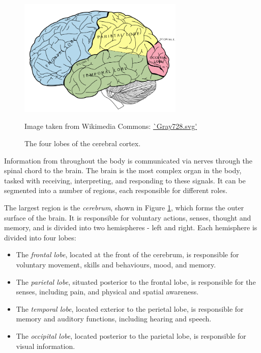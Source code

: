\begin{figure}[ht]
	\centering
	\includegraphics[width=0.7\textwidth]{Images/2_Lobes_of_the_brain_NL.png}
	\caption{The four lobes of the cerebral cortex.}
	\small Image taken from Wikimedia Commons: \url{`Gray728.svg'}
	\label{svd-cerebrumfig}
\end{figure}

Information from throughout the body is communicated via nerves through the spinal chord to the brain. The brain is the most complex organ in the body, tasked with receiving, interpreting, and responding to these signals. It can be segmented into a number of regions, each responsible for different roles.

The largest region is the \textit{cerebrum}, shown in Figure \ref{svd-cerebrumfig}, which forms the outer surface of the brain. It is responsible for voluntary actions, senses, thought and memory, and is divided into two hemispheres - left and right. Each hemisphere is divided into four lobes:
 \begin{itemize}
	\item The \textit{frontal lobe}, located at the front of the cerebrum, is responsible for voluntary movement, skills and behaviours, mood, and memory.
	\item The \textit{parietal lobe}, situated posterior to the frontal lobe, is responsible for the senses, including pain, and physical and spatial awareness.
	\item The \textit{temporal lobe}, located exterior to the perietal lobe, is responsible for memory and auditory functions, including hearing and speech.
	\item The \textit{occipital lobe}, located posterior to the parietal lobe, is responsible for visual information.
\end{itemize}

